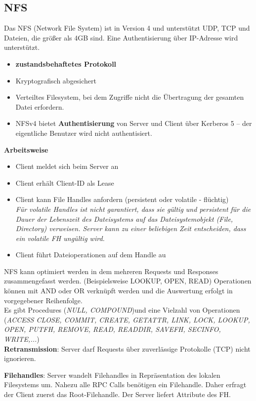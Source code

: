 \documentclass{article} %
\begin{document}
\subsection{NFS}
Das NFS (Network File System) ist in Version 4 und unterstützt UDP, TCP und Dateien, die größer als 4GB sind. Eine Authentisierung über IP-Adresse wird unterstützt.\\
	\begin{itemize}
	\item \textbf{zustandsbehaftetes Protokoll}
	\item Kryptografisch abgesichert
	\item Verteiltes Filesystem, bei dem Zugriffe nicht die Übertragung der gesamten Datei erfordern.
	\item NFSv4 bietet \textbf{Authentisierung} von Server und Client über 
	Kerberos 5 – der eigentliche Benutzer wird nicht 
	authentisiert. 
	\end{itemize}
\textbf{Arbeitsweise}
	\begin{itemize}
	\item Client meldet sich beim Server an
	\item Client erhält Client-ID als Lease
	\item Client kann File Handles anfordern (persistent oder volatile - flüchtig)\\
	\textit{Für volatile Handles ist nicht garantiert, dass sie gültig und 	persistent für die Dauer der Lebenszeit des Dateisystems auf das Dateisystemobjekt (File, Directory) verweisen. Server kann zu einer beliebigen Zeit entscheiden, dass ein volatile FH ungültig wird. }
	\item Client führt Dateioperationen auf dem Handle au
	\end{itemize}
NFS kann optimiert werden in dem mehreren Requests und Responses zusammengefasst werden. (Beispielsweise LOOKUP, OPEN, READ) Operationen können mit AND oder OR verknüpft werden und die Auswertung erfolgt in vorgegebener Reihenfolge.\\

\noindent Es gibt Procedures (\textit{NULL, COMPOUND})und eine Vielzahl von Operationen (\textit{ACCESS CLOSE, COMMIT, CREATE, GETATTR, LINK, LOCK, LOOKUP, OPEN, PUTFH, REMOVE, READ, READDIR, SAVEFH, SECINFO, WRITE,...})\\

\noindent\textbf{Retransmission}: Server darf Requests über zuverlässige Protokolle (TCP) nicht ignorieren. 

\noindent\textbf{Filehandles}: Server wandelt Filehandles in Repräsentation des lokalen Filesystems um. Nahezu alle RPC Calls benötigen ein Filehandle. Daher erfragt der Client zuerst das Root-Filehandle. Der Server liefert Attribute des FH.\\
\end{document}
